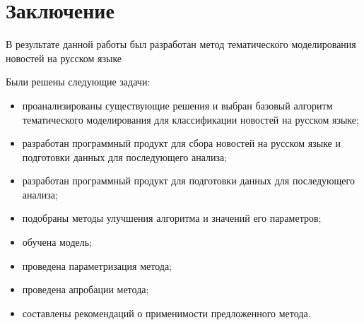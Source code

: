\chapter{Заключение}

В результате данной работы был разработан метод тематического моделирования новостей на русском языке

Были решены следующие задачи:

\begin{itemize}
    \item проанализированы существующие решения и выбран базовый алгоритм тематического моделирования для классификации новостей на русском языке;
    \item разработан программный продукт для сбора новостей на русском языке и подготовки данных для последующего анализа;
    \item разработан программный продукт для подготовки данных для последующего анализа;
    \item подобраны методы улучшения алгоритма и значений его параметров;
    \item обучена модель;
    \item проведена параметризация метода;
    \item проведена апробации метода;
    \item составлены рекомендаций о применимости предложенного метода.
\end{itemize}


